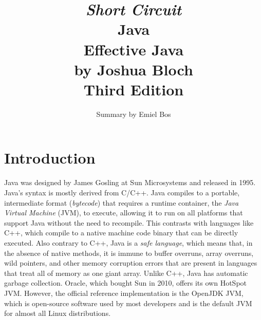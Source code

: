 \documentclass[table, xcdraw]{article}%
\title{
\textit{Short Circuit}\\
\vspace{15px}
\huge
Java\\
\vspace{20px}
\large
Effective Java\\
by Joshua Bloch\\
Third Edition
}
\author{Summary by Emiel Bos}
\date{}
\begin{document}
\maketitle

\section{Introduction}

Java was designed by James Gosling at Sun Microsystems and released in 1995. Java's syntax is mostly derived from C/C++. Java compiles to a portable, intermediate format (\textit{bytecode}) that requires a runtime container, the \textit{Java Virtual Machine} (JVM), to execute, allowing it to run on all platforms that support Java without the need to recompile. This contrasts with languages like C++, which compile to a native machine code binary that can be directly executed. Also contrary to C++, Java is a \emph{safe language}, which means that, in the absence of native methods, it is immune to buffer overruns, array overruns, wild pointers, and other memory corruption errors that are present in languages that treat all of memory as one giant array. Unlike C++, Java has automatic garbage collection. Oracle, which bought Sun in 2010, offers its own HotSpot JVM. However, the official reference implementation is the OpenJDK JVM, which is open-source software used by most developers and is the default JVM for almost all Linux distributions.
\end{document}
